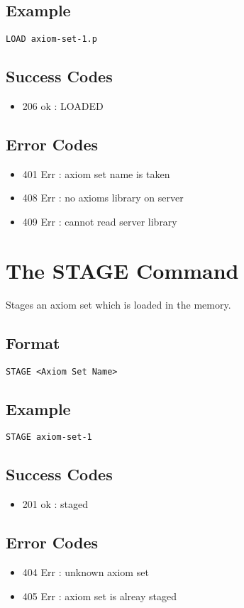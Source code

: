\subsection{Example}
\begin{lstlisting}
LOAD axiom-set-1.p
\end{lstlisting}
\subsection{Success Codes}
\begin{itemize}
  \item 206 ok : LOADED
\end{itemize}
\subsection{Error Codes}
\begin{itemize}
  \item 401 Err : axiom set name is taken
  \item 408 Err : no axioms library on server
  \item 409 Err : cannot read server library
\end{itemize}
\clearpage


\section{The STAGE Command}
Stages an axiom set which is loaded in the memory.
\subsection{Format}
\begin{lstlisting}
STAGE <Axiom Set Name>
\end{lstlisting}
\subsection{Example}
\begin{lstlisting}
STAGE axiom-set-1
\end{lstlisting}
\subsection{Success Codes}
\begin{itemize}
    \item 201 ok : staged
\end{itemize}
\subsection{Error Codes}
\begin{itemize}
    \item 404 Err : unknown axiom set
    \item 405 Err : axiom set is alreay staged
\end{itemize}
\clearpage

